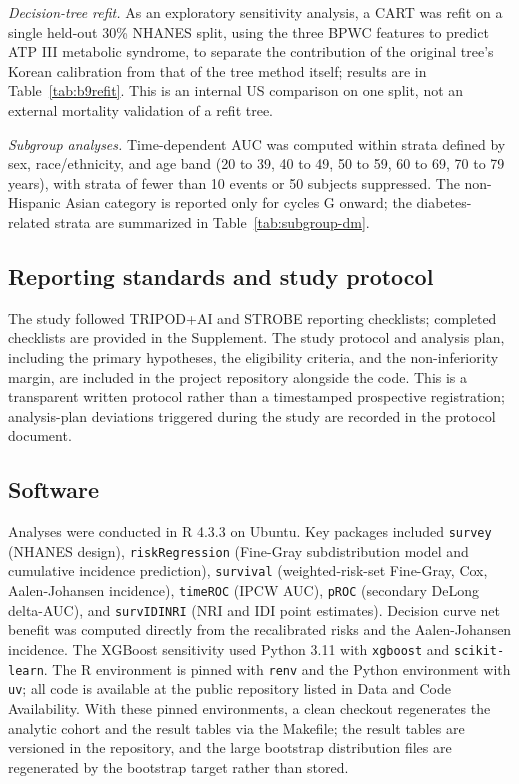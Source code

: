 \documentclass[11pt]{article}
\begin{document}
\emph{Decision-tree refit.} As an exploratory sensitivity analysis, a CART was refit on a single held-out 30\% NHANES split, using the three BPWC features to predict ATP III metabolic syndrome, to separate the contribution of the original tree's Korean calibration from that of the tree method itself; results are in Table~\ref{tab:b9refit}. This is an internal US comparison on one split, not an external mortality validation of a refit tree.

\emph{Subgroup analyses.} Time-dependent AUC was computed within strata defined by sex, race/ethnicity, and age band (20 to 39, 40 to 49, 50 to 59, 60 to 69, 70 to 79 years), with strata of fewer than 10 events or 50 subjects suppressed. The non-Hispanic Asian category is reported only for cycles G onward; the diabetes-related strata are summarized in Table~\ref{tab:subgroup-dm}.

\subsection*{Reporting standards and study protocol}

The study followed TRIPOD+AI \citep{tripodai2024} and STROBE \citep{strobe2007} reporting checklists; completed checklists are provided in the Supplement. The study protocol and analysis plan, including the primary hypotheses, the eligibility criteria, and the non-inferiority margin, are included in the project repository alongside the code. This is a transparent written protocol rather than a timestamped prospective registration; analysis-plan deviations triggered during the study are recorded in the protocol document.

\subsection*{Software}

Analyses were conducted in R 4.3.3 on Ubuntu. Key packages included \texttt{survey} (NHANES design), \texttt{riskRegression} (Fine-Gray subdistribution model and cumulative incidence prediction), \texttt{survival} (weighted-risk-set Fine-Gray, Cox, Aalen-Johansen incidence), \texttt{timeROC} (IPCW AUC), \texttt{pROC} (secondary DeLong delta-AUC), and \texttt{survIDINRI} (NRI and IDI point estimates). Decision curve net benefit was computed directly from the recalibrated risks and the Aalen-Johansen incidence. The XGBoost sensitivity used Python 3.11 with \texttt{xgboost} and \texttt{scikit-learn}. The R environment is pinned with \texttt{renv} and the Python environment with \texttt{uv}; all code is available at the public repository listed in Data and Code Availability. With these pinned environments, a clean checkout regenerates the analytic cohort and the result tables via the Makefile; the result tables are versioned in the repository, and the large bootstrap distribution files are regenerated by the bootstrap target rather than stored.
\end{document}
